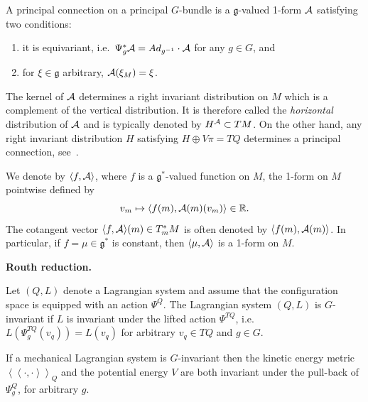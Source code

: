 \documentclass[11pt]{article}
\renewcommand{\ll}{\left<\!\left<}
\renewcommand{\gg}{\right>\!\right>}
\newcommand{\R}{\mathbb{R}}
\newcommand{\A}{{\cal A}}
\newcommand{\lag}{\mathfrak{g}}
\begin{document}
\begin{definition} A principal connection on a principal $G$-bundle is a $\lag$-valued 1-form $\A$ satisfying two conditions:
\begin{enumerate}\itemsep=0pt
\item[1)] it is equivariant, i.e.\ $\Psi^*_g\A = {\rm Ad}_{g^{-1}} \cdot \A$ for any $g\in G$, and
\item[2)] for $\xi\in\lag$ arbitrary, $\A ( \xi_M)=\xi$.\end{enumerate} \end{definition}
The kernel of $\A$ determines a right invariant distribution on $M$ which is a complement of the vertical distribution. It is therefore called the {\em horizontal} distribution of $\A$ and is typically denoted by $H^{\A}\subset TM$. On the other hand, any right invariant distribution $H$ satisfying $H\oplus V\pi = TQ$ determines a principal connection, see~\cite{koba}.

We denote by $\langle f ,\A\rangle$, where $f$ is a $\lag^*$-valued function on $M$,  the 1-form on $M$ pointwise def\/ined by \[v_m\mapsto \langle f(m),\A(m)(v_m)\rangle\in \R.\] The cotangent vector $\langle f ,\A\rangle(m)\in T_m^*M$ is often denoted by $\langle f(m),\A(m)\rangle$.  In particular, if $f=\mu\in\lag^*$ is constant, then $\langle \mu,\A\rangle$ is a 1-form on $M$.

{\bf Routh reduction.}

\begin{definition} Let $(Q,L)$ denote a Lagrangian system and assume that the conf\/iguration space is equipped with an action $\Psi^Q$. The Lagrangian system $(Q,L)$ is $G$-invariant if $L$ is invariant under the lifted action $\Psi^{TQ}$, i.e.\ $L(\Psi^{TQ}_g(v_q))=L(v_q)$ for arbitrary $v_q\in TQ$ and $g\in G$.
\end{definition}

If a mechanical Lagrangian system is $G$-invariant then the kinetic energy metric $\ll \cdot, \cdot \gg_Q$ and the potential energy $V$ are both invariant under the pull-back of $\Psi^Q_g$, for arbitrary $g$.
\end{document}
